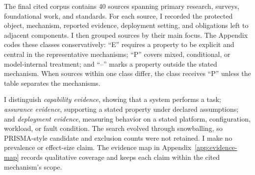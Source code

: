 The final cited corpus contains 40 sources spanning primary research, surveys,
foundational work, and standards.  For each source, I recorded the protected
object, mechanism, reported evidence, deployment setting, and obligations left
to adjacent components.  I then grouped sources by their main focus.
The Appendix codes these classes conservatively: ``E'' requires a property to be
explicit and central in the representative mechanisms; ``P'' covers mixed,
conditional, or model-internal treatment; and ``--'' marks a property outside
the stated mechanism.  When sources within one class differ, the class receives
``P'' unless the table separates the mechanisms.

I distinguish \emph{capability evidence}, showing that a system performs a
task; \emph{assurance evidence}, supporting a stated property under declared
assumptions; and \emph{deployment evidence}, measuring behavior on a stated
platform, configuration, workload, or fault condition.  The search evolved
through snowballing, so PRISMA-style candidate and exclusion counts
were not retained.  I make no prevalence or effect-size claim.  The evidence map
in Appendix~\ref{app:evidence-map} records qualitative coverage and keeps each
claim within the cited mechanism's scope.
